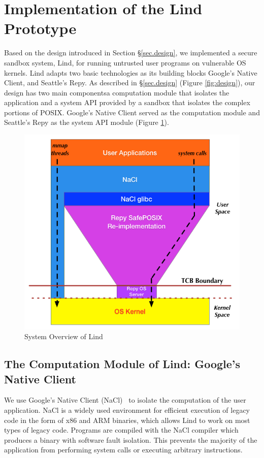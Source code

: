 \section{Implementation of the Lind Prototype}
\label{sec.implementation}

Based on the design introduced in Section \S{\ref{sec.design}}, 
we implemented a secure sandbox system, Lind, 
for running untrusted user programs on vulnerable OS kernels. 
Lind adapts two basic technologies as its building blocks\textendash 
Google's Native Client, and Seattle's Repy. 
As described in \S{\ref{sec.design}} (Figure \ref{fig:design}), our design has
two main components\textendash a computation module that isolates the 
application and a system API provided by a sandbox that isolates the complex 
portions of POSIX.
Google's Native Client served as the computation 
module 
and Seattle's Repy as the system API module (Figure \ref{fig:architecture}).

\begin{figure}%
\centering
\includegraphics[width=1.0\columnwidth]{diagram/lind_architecture.png}
\caption{System Overview of Lind}
\label{fig:architecture}
\end{figure}

\subsection{The Computation Module of Lind: Google's Native Client}
We use Google's Native Client (NaCl)~\cite{NaCl-09} to isolate the computation
of the user application.  NaCl is a widely used environment for efficient 
execution of legacy code in the form of x86 and ARM binaries, which allows
Lind to work on most types of legacy code.   Programs are compiled with
the NaCl compiler which produces a binary with software fault isolation.
This prevents the majority of the application from performing system calls 
or executing arbitrary instructions. 


